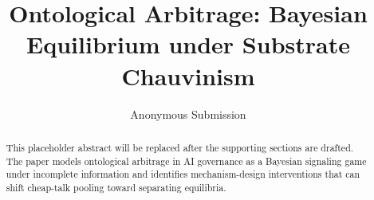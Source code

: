 \documentclass[letterpaper]{article}
\title{Ontological Arbitrage: Bayesian Equilibrium under Substrate Chauvinism}
\author{
    Anonymous Submission
}
\begin{document}
\maketitle

\begin{abstract}
This placeholder abstract will be replaced after the supporting sections are
drafted. The paper models ontological arbitrage in AI governance as a Bayesian
signaling game under incomplete information and identifies mechanism-design
interventions that can shift cheap-talk pooling toward separating equilibria.
\end{abstract}







\end{document}
